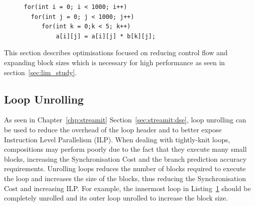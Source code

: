 
\begin{figure}[t]
\lstset{language=C,numbersep=4pt}
\begin{center}
\begin{lstlisting}
for(int i = 0; i < 1000; i++)
  for(int j = 0; j < 1000; j++)
     for(int k = 0;k < 5; k++)
         a[i][j] = a[i][j] * b[k][j];
\end{lstlisting}
\end{center}
\vspace{-2em}
\label{lst:small}
\vspace{-2em}
\end{figure}

This section describes optimisations focused on reducing control flow and expanding block sizes which is necessary for high performance as seen in section~\ref{sec:lim_study}.

\subsection{Loop Unrolling}
As seen in Chapter~\ref{chp:streamit} Section~\ref{sec:streamit:dse}, loop unrolling can be used to reduce the overhead of the loop header and to better expose Instruction Level Parallelism (ILP).
When dealing with tightly-knit loops, compositions may perform poorly due to the fact that they execute many small blocks, increasing the Synchronisation Cost and the branch prediction accuracy requirements.
Unrolling loops reduces the number of blocks required to execute the loop and increases the size of the blocks, thus reducing the Synchronisation Cost and increasing ILP.
For example, the innermost loop in Listing~\ref{lst:small} should be completely unrolled and its outer loop unrolled to increase the block size.

